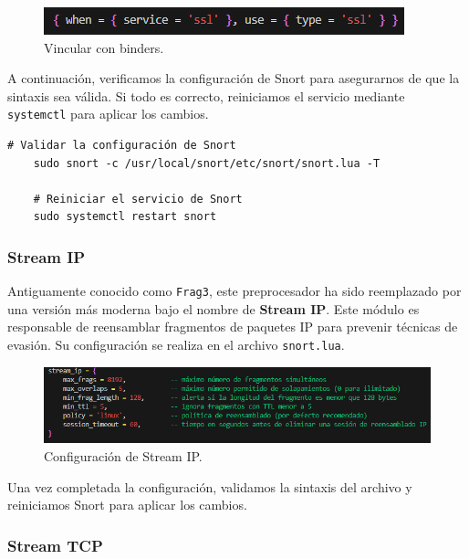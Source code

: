 \documentclass[11pt,a4paper,twoside]{report}
\begin{document}
\begin{figure}[H]
	\centering
	\includegraphics[scale=0.8]{ssl_inspect/9.png}
	\caption{Vincular con binders.}
\end{figure}

A continuación, verificamos la configuración de Snort para asegurarnos de que la sintaxis sea válida. Si todo es correcto, reiniciamos el servicio mediante \texttt{systemctl} para aplicar los cambios.

\begin{lstlisting}[style=commandstyle, caption={Validación de la configuración y reinicio del servicio Snort}, label={lst:validacion-snort}]
	# Validar la configuración de Snort
	sudo snort -c /usr/local/snort/etc/snort/snort.lua -T
	
	# Reiniciar el servicio de Snort
	sudo systemctl restart snort
\end{lstlisting}

\subsubsection*{Stream IP}

Antiguamente conocido como \texttt{Frag3}, este preprocesador ha sido reemplazado por una versión más moderna bajo el nombre de \textbf{Stream IP}. Este módulo es responsable de reensamblar fragmentos de paquetes IP para prevenir técnicas de evasión. Su configuración se realiza en el archivo \texttt{snort.lua}.

\begin{figure}[H]
	\centering
	\includegraphics[scale=0.8]{stream_ip/1.png}
	\caption{Configuración de Stream IP.}
\end{figure}

Una vez completada la configuración, validamos la sintaxis del archivo y reiniciamos Snort para aplicar los cambios.

\subsubsection*{Stream TCP}
\end{document}
